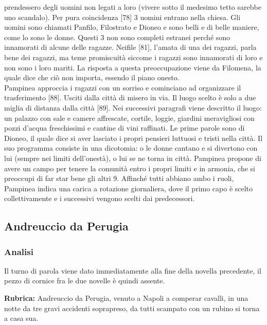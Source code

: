 \documentclass[a4paper]{article}
\begin{document}
prendessero degli uomini non legati a loro (vivere sotto il medesimo tetto sarebbe uno scandalo).
Per pura coincidenza [78] 3 uomini entrano nella chiesa. Gli uomini sono chiamati Panfilo, Filostrato e Dioneo
e sono belli e di belle maniere, come lo sono le donne.
Questi 3 non sono completi estranei perché sono innamorati di alcune delle ragazze.
Neifile [81], l'amata di una dei ragazzi, parla bene dei ragazzi, ma teme
promiscuità siccome i ragazzi sono innamorati di loro e non sono i loro mariti.
La risposta a questa preoccupazione viene da Filomena, la quale dice che ciò non importa,
essendo il piano onesto. \\
Pampinea approccia i ragazzi con un sorriso e cominciano ad organizzare il trasferimento [88].
Usciti dalla città di misero in via. Il luogo scelto è solo a due miglia di distanza dalla città [89].
Nei successivi paragrafi viene descritto il luogo: un palazzo con sale e camere affrescate, cortile, loggie,
giardini meravigliosi con pozzi d'acqua freschissimi e cantine di vini raffinati.
Le prime parole sono di Dioneo, il quale dice si aver lasciato i propri pensieri luttuosi e tristi nella città.
Il suo programma consiste in una dicotomia: o le donne cantano e si divertono con lui
(sempre nei limiti dell'onestà), o lui se ne torna in città.
Pampinea propone di avere un campo per tenere la comunità entro i propri limiti e in armonia,
che si preoccupi di far star bene gli altri 9.
Affinché tutti abbiano ambo i ruoli, Pampinea indica una carica a rotazione giornaliera,
dove il primo capo è scelto collettivamente e i successivi vengono scelti dai predecessori.

\pagebreak

\subsection{Andreuccio da Perugia}

\subsubsection{Analisi}

Il turno di parola viene dato immediatamente alla fine della novella precedente,
il pezzo di cornice fra le due novelle è quindi assente. 

\textbf{Rubrica:} Andreuccio da Perugia, venuto a Napoli a comperar cavalli, in una notte
da tre gravi accidenti soprapreso, da tutti scampato con un rubino si torna a
casa sua.
\end{document}

